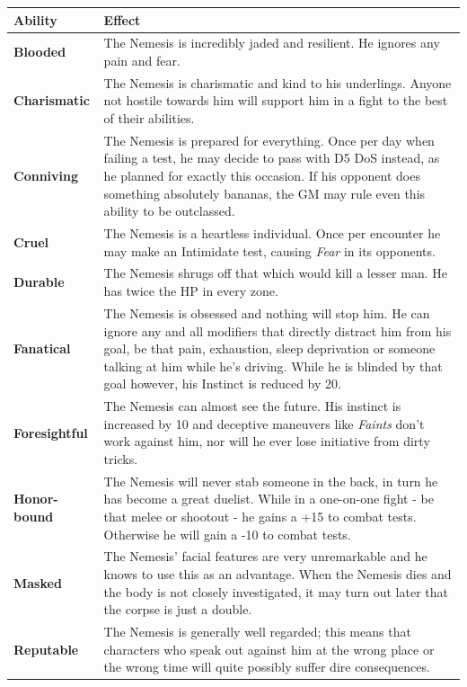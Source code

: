 \documentclass[12pt,a4paper,openany,usenames,dvipsnames]{book}
\begin{document}
	{\setlength{\extrarowheight}{5pt}
	\begin{tabularx}{\textwidth}{l|X}
		Ability & Effect\\
		\hline
		\textbf{Blooded} & The Nemesis is incredibly jaded and resilient. He ignores any pain and fear.\\
		\hline
		\textbf{Charismatic} & The Nemesis is charismatic and kind to his underlings. Anyone not hostile towards him will support him in a fight to the best of their abilities.\\
		\hline
		\textbf{Conniving} & The Nemesis is prepared for everything. Once per day when failing a test, he may decide to pass with D5 DoS instead, as he planned for exactly this occasion. If his opponent does something absolutely bananas, the GM may rule even this ability to be outclassed.\\
		\hline
		\textbf{Cruel} & The Nemesis is a heartless individual. Once per encounter he may make an Intimidate test, causing \emph{Fear} in its opponents.\\
		\hline
		\textbf{Durable} & The Nemesis shrugs off that which would kill a lesser man. He has twice the HP in every zone.\\
		\hline
		\textbf{Fanatical} & The Nemesis is obsessed and nothing will stop him. He can ignore any and all modifiers that directly distract him from his goal, be that pain, exhaustion, sleep deprivation or someone talking at him while he's driving. While he is blinded by that goal however, his Instinct is reduced by 20.\\
		\hline
		\textbf{Foresightful} & The Nemesis can almost see the future. His instinct is increased by 10 and deceptive maneuvers like \emph{Faints} don't work against him, nor will he ever lose initiative from dirty tricks.\\
		\hline
		\textbf{Honor-bound} & The Nemesis will never stab someone in the back, in turn he has become a great duelist. While in a one-on-one fight - be that melee or shootout - he gains a +15 to combat tests. Otherwise he will gain a -10 to combat tests.\\
		\hline
		\textbf{Masked} & The Nemesis' facial features are very unremarkable and he knows to use this as an advantage. When the Nemesis dies and the body is not closely investigated, it may turn out later that the corpse is just a double.\\
		\hline
		\textbf{Reputable} & The Nemesis is generally well regarded; this means that characters who speak out against him at the wrong place or the wrong time will quite possibly suffer dire consequences.
	\end{tabularx}}
	
\end{document}
